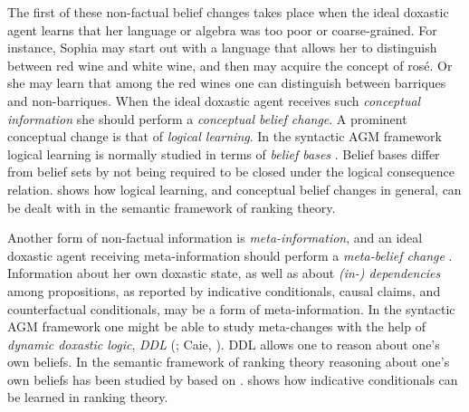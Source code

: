 The first of these non-factual belief changes takes place when the ideal doxastic agent learns that her language or algebra was too poor or coarse-grained. For instance, Sophia may start out with a language that allows her to distinguish between red wine and white wine, and then may acquire the concept of ros\'{e}. Or she may learn that among the red wines one can distinguish between barriques and non-barriques. When the ideal doxastic agent receives such \emph{conceptual information} she should perform a \emph{conceptual belief change}. A prominent conceptual change is that of \emph{logical learning}. In the syntactic AGM framework logical learning is normally studied in terms of \emph{belief bases} \citep{h99}. Belief bases differ from belief sets by not being required to be closed under the logical consequence relation. \citet{h15a} shows how logical learning, and conceptual belief changes in general, can be dealt with in the semantic framework of ranking theory.

Another form of non-factual information is \emph{meta-information}, and an ideal doxastic agent receiving meta-information should perform a \emph{meta-belief change} \citep{s09}. Information about her own doxastic state, as well as about \emph{(in-) dependencies} among propositions, as reported by indicative conditionals, causal claims, and counterfactual conditionals, may be a form of meta-information. In the syntactic AGM framework one might be able to study meta-changes with the help of \emph{dynamic doxastic logic}, \emph{DDL} (\citealt{s95, lr99}; Caie, ). DDL allows one to reason about one's own beliefs. In the semantic framework of ranking theory reasoning about one's own beliefs has been studied by \citet[chaper 9]{s12} %
 based on \citet{h98}. \citet{h15a} shows how indicative conditionals %
can be learned in ranking theory.

